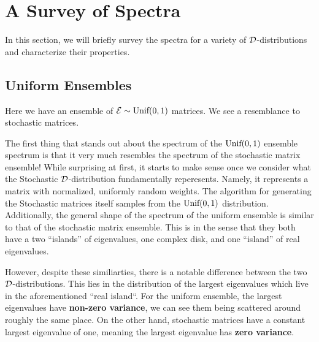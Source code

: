 \trim
{}%

\newpage
\section{A Survey of Spectra}

In this section, we will briefly survey the spectra for a variety of $\mathcal{D}$-distributions and characterize their properties.

\subsection{Uniform Ensembles}
Here we have an ensemble of $\mathcal{E} \sim \text{Unif}(0,1)$ matrices. We see a resemblance to
stochastic matrices.

\vspace{-1em}
\vspace{-2em}

The first thing that stands out about the spectrum of the $\text{Unif}(0,1)$ ensemble spectrum is that it very much resembles the spectrum of the stochastic matrix ensemble!
While surprising at first, it starts to make sense once we consider what the Stochastic $\mathcal{D}$-distribution fundamentally reperesents. Namely, it represents a matrix with normalized, uniformly random weights. The algorithm for generating the Stochastic matrices itself samples from the $\text{Unif}(0,1)$ distribution. Additionally, the general shape of the spectrum of the uniform ensemble is similar to that of the stochastic matrix ensemble. This is in the sense that they both have a two ``islands'' of eigenvalues, one complex disk, and one ``island'' of real eigenvalues. \newline

However, despite these similiarties, there is a notable difference between the two $\mathcal{D}$-distributions. This lies in the distribution of the largest eigenvalues which live in the aforementioned ``real island``. For the uniform ensemble, the largest eigenvalues have \textbf{non-zero variance}, we can see them being scattered around roughly the same place. On the other hand, stochastic matrices have a constant largest eigenvalue of one, meaning the largest eigenvalue has \textbf{zero variance}.

